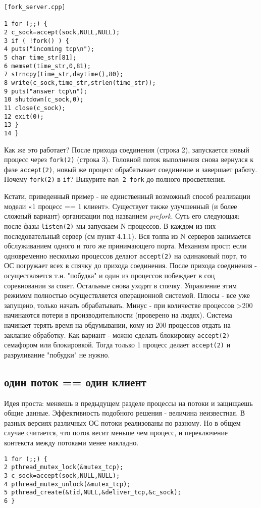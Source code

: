 \begin{verbatim}
[fork_server.cpp]

1 for (;;) {
2 c_sock=accept(sock,NULL,NULL);
3 if ( !fork() ) {
4 puts("incoming tcp\n");
5 char time_str[81];
6 memset(time_str,0,81);
7 strncpy(time_str,daytime(),80);
8 write(c_sock,time_str,strlen(time_str));
9 puts("answer tcp\n");
10 shutdown(c_sock,0);
11 close(c_sock);
12 exit(0);
13 }
14 }
\end{verbatim}

Как же это работает? После прихода соединения (строка 2), запускается новый процесс через \verb+fork(2)+ (строка 3). Головной поток выполнения снова вернулся к фазе \verb+accept(2)+, новый же процесс обрабатывает соединение и завершает работу. Почему \verb+fork(2)+ в \verb+if+? Выкурите \verb+man 2 fork+ до полного просветления.

Кстати, приведенный пример - не единственный возможный способ реализации модели «1 процесс == 1 клиент». Существует также улучшенный (и более сложный вариант) организации под названием \emph{prefork}. Суть его следующая: после фазы \verb+listen(2)+ мы запускаем N процессов. В каждом из них - последовательный сервер (см пункт 4.1.1). Вся толпа из N серверов занимается обслуживанием одного и того же принимающего порта. Механизм прост: если одновременно несколько процессов делают \verb+accept(2)+ на одинаковый порт, то ОС погружает всех в спячку до прихода соединения. После прихода соединения - осуществляется т.н. "побудка" и один из процессов побеждает в соц соревновании за сокет. Остальные снова уходят в спячку. Управление этим режимом полностью осуществляется операционной системой.
Плюсы - все уже запущено, только начать обрабатывать. Минус - при количестве процессов >200 начинаются потери в производительности (проверено на людях). Система начинает терять время на обдумывании, кому из 200 процессов отдать на заклание обработку. Как вариант - можно сделать блокировку \verb+accept(2)+ семафором или блокировкой. Тогда только 1 процесс делает \verb+accept(2)+ и разруливание "побудки" не нужно.

\subsection{один поток == один клиент}

Идея проста: меняешь в предыдущем разделе процессы на потоки и защищаешь общие данные. Эффективность подобного решения - величина неизвестная. В разных версиях различных ОС потоки реализованы по разному. Но в общем случае считается, что поток весит меньше чем процесс, и переключение контекста между потоками менее накладно.
\begin{verbatim}
1 for (;;) {
2 pthread_mutex_lock(&mutex_tcp);
3 c_sock=accept(sock,NULL,NULL);
4 pthread_mutex_unlock(&mutex_tcp);
5 pthread_create(&tid,NULL,&deliver_tcp,&c_sock);
6 }
\end{verbatim}

